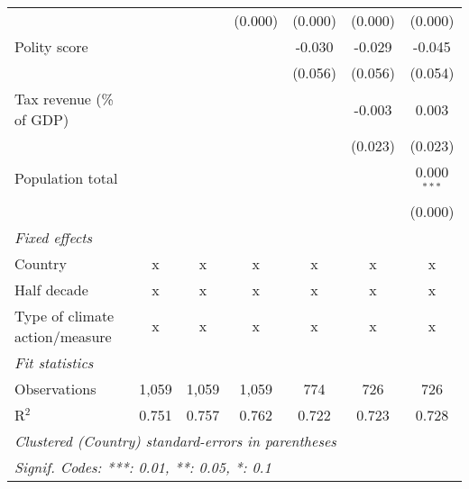 \begin{tabular}{lcccccc}
                                                                                    &                &               & (0.000)       & (0.000)       & (0.000)       & (0.000)\\   
   Polity score                                                                     &                &               &               & -0.030        & -0.029        & -0.045\\   
                                                                                    &                &               &               & (0.056)       & (0.056)       & (0.054)\\   
   Tax revenue (\% of GDP)                                                          &                &               &               &               & -0.003        & 0.003\\   
                                                                                    &                &               &               &               & (0.023)       & (0.023)\\   
   Population total                                                                 &                &               &               &               &               & 0.000$^{***}$\\   
                                                                                    &                &               &               &               &               & (0.000)\\   
   \emph{Fixed effects}\\
   Country                                                                          & x              & x             & x             & x             & x             & x\\  
   Half decade                                                                      & x              & x             & x             & x             & x             & x\\  
   Type of climate action/measure                                                   & x              & x             & x             & x             & x             & x\\  
   \midrule \emph{Fit statistics}\\
   Observations                                                                     & 1,059          & 1,059         & 1,059         & 774           & 726           & 726\\  
   R$^2$                                                                            & 0.751          & 0.757         & 0.762         & 0.722         & 0.723         & 0.728\\  
   \midrule
   \multicolumn{7}{l}{\emph{Clustered (Country) standard-errors in parentheses}}\\
   \multicolumn{7}{l}{\emph{Signif. Codes: ***: 0.01, **: 0.05, *: 0.1}}\\
\end{tabular}
\par\endgroup


